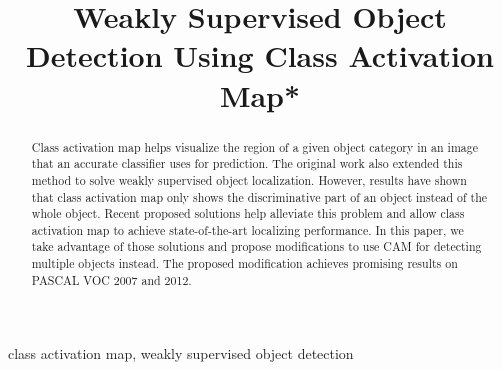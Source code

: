 \documentclass[conference]{IEEEtran}
\begin{document}
\title{Weakly Supervised Object Detection Using Class Activation Map*\\
}

\author{
    \and
    \and
}

\maketitle

\begin{abstract}
    Class activation map helps visualize the region of a given object category in an image that an accurate classifier uses for prediction. The original work also extended this method to solve weakly supervised object localization. However, results have shown that class activation map only shows the discriminative part of an object instead of the whole object. Recent proposed solutions help alleviate this problem and allow class activation map to achieve state-of-the-art localizing performance. In this paper, we take advantage of those solutions and propose modifications to use CAM for detecting multiple objects instead. The proposed modification achieves promising results on PASCAL VOC 2007 and 2012.
\end{abstract}

\begin{IEEEkeywords}
    class activation map, weakly supervised object detection
\end{IEEEkeywords}
\end{document}
